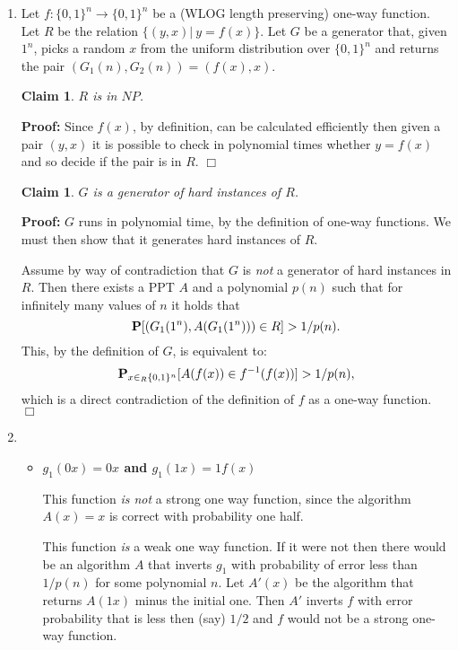 \documentclass[11pt]{article} \usepackage{amssymb}
\newtheorem{claim}[theorem]{Claim}
\newenvironment{proof}{\noindent \textbf{Proof:}}{$\Box$}
\begin{document}
\begin{enumerate}
\item Let $f:\{0,1\}^n\to\{0,1\}^n$ be a (WLOG length preserving) 
  one-way function. Let $R$ be the relation
  $\{(y,x)|\:y=f(x)\}$. Let $G$ be a generator that, given $1^n$, picks a random
  $x$ from the uniform distribution over $\{0,1\}^n$ and returns the pair
  $(G_1(n),G_2(n))=(f(x),x)$.
  
  \begin{claim}
    $R$ is in $NP$.
  \end{claim}
  \begin{proof}
    Since $f(x)$, by definition, can be calculated efficiently then given a pair
    $(y,x)$ it is possible to check in polynomial times whether $y=f(x)$ and so 
    decide if the pair is in $R$.
  \end{proof}
  \begin{claim}
    $G$ is a generator of hard instances of $R$.
  \end{claim}
  \begin{proof}
    $G$ runs in polynomial time, by the definition of one-way functions. We 
    must then show that it generates hard instances of $R$.
    
    Assume by way of contradiction that $G$ is {\em not} a generator of hard
    instances in $R$. Then there exists a PPT $A$ and a polynomial $p(n)$ such
    that for infinitely many values of $n$ it holds that
    $$\P[(G_1(1^n), A(G_1(1^n)))\in R]>1/p(n).$$
    This, by the definition of $G$, is equivalent to:
    $$\P_{x\in_R\{0,1\}^n}[A(f(x))\in f^{-1}(f(x))]>1/p(n),$$
    which is a direct contradiction of the definition of $f$ as a one-way 
    function.
  \end{proof}
  
\item
  \begin{itemize}
  \item {\bf $g_1(0x) = 0x$ and $g_1(1x) = 1f(x)$}

    This function {\em is not} a strong one way function, since the algorithm
    $A(x)=x$ is correct with probability one half. 

    This function {\em is } a weak one way function. If it were not then there
    would be an algorithm $A$ that inverts $g_1$ with probability of error 
    less than $1/p(n)$ for some polynomial $n$. Let $A'(x)$ be the algorithm
    that returns $A(1x)$ minus the initial one. Then $A'$ inverts $f$ with
    error probability that is less then (say) $1/2$ and $f$ would not be a
    strong one-way function.


\end{itemize}
\end{enumerate}
\end{document}
